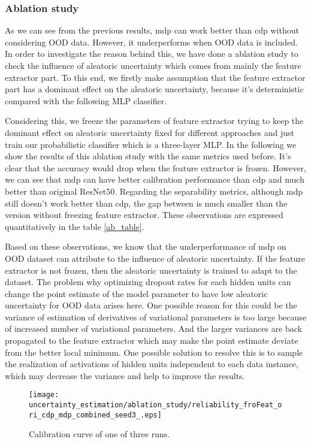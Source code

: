 \subsubsection{Ablation study}
As we can see from the previous results, mdp can work better than cdp without considering OOD data. However, it underperforms when OOD data is included. In order to investigate the reason behind this, we have done a ablation study to check the influence of aleatoric uncertainty which comes from mainly the feature extractor part. To this end, we firstly make assumption that the feature extractor part has a dominant effect on the aleatoric uncertainty, because it's deterministic compared with the following MLP classifier. 

Considering this, we freeze the parameters of feature extractor trying to keep the dominant effect on aleatoric uncertainty fixed for different approaches and just train our probabilistic classifier which is a three-layer MLP. In the following we show the results of this ablation study with the same metrics used before. It's clear that the accuracy would drop when the feature extractor is frozen. However, we can see that mdp can have better  calibration performance than cdp and much better than original ResNet50. Regarding the separability metrics, although mdp still doesn't work better than cdp, the gap between is much smaller than the version without freezing feature extractor. These observations are expressed quantitatively in the table \ref{ab_table}. 

Based on these observations, we know that the underperformance of mdp on OOD dataset can attribute to the influence of aleatoric uncertainty. If the feature extractor is not frozen, then the aleatoric uncertainty is trained to adapt to the dataset. The problem why optimizing dropout rates for each hidden units can change the point estimate of the model parameter to have low aleatoric uncertainty for OOD data arises here. One possible reason for this could be the variance of estimation of derivatives of variational parameters is too large because of increased number of variational parameters\cite{kingma2015variational}. And the larger variances are back propagated to the feature extractor which may make the point estimate deviate from the better local minimum. One possible solution to resolve this is to sample the realization of activations of hidden units independent to each data instance, which may decrease the variance and help to improve the results. 

\begin{figure}[H]
	\begin{center}
		\texttt{[image: uncertainty\_estimation/ablation\_study/reliability\_froFeat\_ori\_cdp\_mdp\_combined\_seed3\_.eps]}
		\caption{Calibration curve of one of three runs.}		
		\label{ab_calibration}
	\end{center}
\end{figure}

